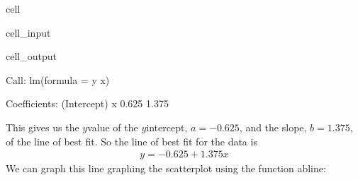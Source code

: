 \documentclass[letterpaper,10pt,english]{jupyterBook}
\begin{document}
\begin{sphinxuseclass}{cell}\begin{sphinxVerbatimInput}

\begin{sphinxuseclass}{cell_input}
\begin{sphinxVerbatim}[commandchars=\\\{\}]

\end{sphinxVerbatim}

\end{sphinxuseclass}\end{sphinxVerbatimInput}
\begin{sphinxVerbatimOutput}

\begin{sphinxuseclass}{cell_output}
\begin{sphinxVerbatim}[commandchars=\\\{\}]
Call:
lm(formula = y \PYGZti{} x)

Coefficients:
(Intercept)            x  
     \PYGZhy{}0.625        1.375  
\end{sphinxVerbatim}

\end{sphinxuseclass}\end{sphinxVerbatimOutput}

\end{sphinxuseclass}
\sphinxAtStartPar
This gives us the \(y\)\sphinxhyphen{}value of the \(y\)\sphinxhyphen{}intercept, \(a = -0.625\), and the slope, \(b = 1.375\), of the line of best fit. So the line of best fit for the data is
\begin{equation*}
\begin{split} y = -0.625 + 1.375x \end{split}
\end{equation*}
\sphinxAtStartPar
We can graph this line  graphing the scatterplot using the function abline:
\end{document}
